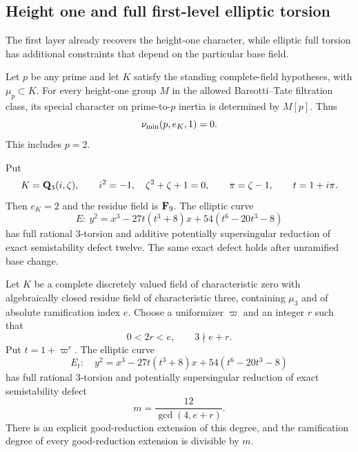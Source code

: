 \subsection{Height one and full first-level elliptic torsion}
The first layer already recovers the height-one character, while elliptic full torsion has additional constraints that depend on the particular base field.

\begin{proposition}\label{prop:height-one-index}
Let $p$ be any prime and let $K$ satisfy the standing complete-field hypotheses, with $\mu_p\subset K$. For every height-one group $M$ in the allowed Barsotti--Tate filtration class, its special character on prime-to-$p$ inertia is determined by $M[p]$. Thus
\[
                         \nu_{\min}(p,e_K,1)=0.
\]
This includes $p=2$.
\end{proposition}

\begin{theorem}\label{thm:explicit-hesse-twelve}
Put
\[
 K=\mathbf Q_3(i,\zeta),\qquad i^2=-1,\quad \zeta^2+\zeta+1=0,
 \qquad \pi=\zeta-1,\qquad t=1+i\pi.
\]
Then $e_K=2$ and the residue field is $\mathbf F_9$. The elliptic curve
\[
 E:\ y^2=x^3-27t(t^3+8)x+54(t^6-20t^3-8)
\]
has full rational $3$-torsion and additive potentially supersingular reduction of exact semistability defect twelve. The same exact defect holds after unramified base change.
\end{theorem}

\begin{theorem}\label{thm:hesse-variable-defect}
Let $K$ be a complete discretely valued field of characteristic zero with algebraically closed residue field of characteristic three, containing $\mu_3$ and of absolute ramification index $e$. Choose a uniformizer $\varpi$ and an integer $r$ such that
\[
                         0<2r<e,\qquad 3\nmid e+r.
\]
Put $t=1+\varpi^r$. The elliptic curve
\[
 E_t:\quad y^2=x^3-27t(t^3+8)x+54(t^6-20t^3-8)
\]
has full rational $3$-torsion and potentially supersingular reduction of exact semistability defect
\[
                             m=\frac{12}{\gcd(4,e+r)}.
\]
There is an explicit good-reduction extension of this degree, and the ramification degree of every good-reduction extension is divisible by $m$.
\end{theorem}

